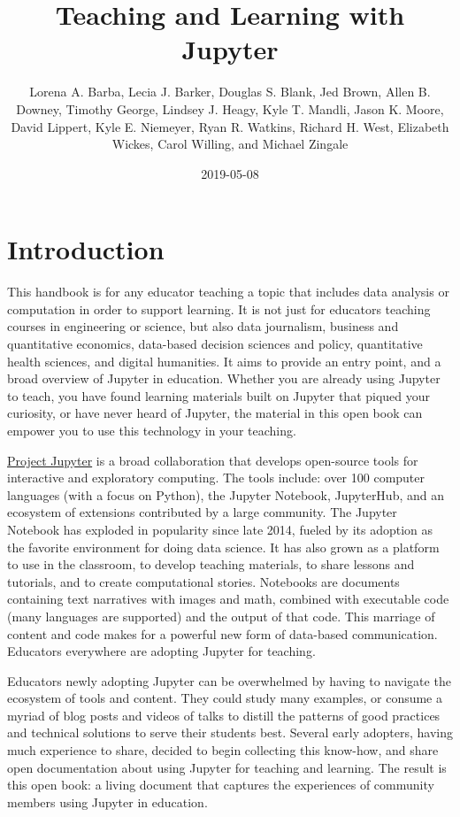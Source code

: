 \documentclass[]{book}
\title{Teaching and Learning with Jupyter}
\author{Lorena A. Barba, Lecia J. Barker, Douglas S. Blank, Jed Brown, Allen B. Downey, Timothy George, Lindsey J. Heagy, Kyle T. Mandli, Jason K. Moore, David Lippert, Kyle E. Niemeyer, Ryan R. Watkins, Richard H. West, Elizabeth Wickes, Carol Willing, and Michael Zingale}
\date{2019-05-08}
\begin{document}
\maketitle

{
\setcounter{tocdepth}{1}
\tableofcontents
}
\hypertarget{intro}{%
\chapter{Introduction}\label{intro}}

This handbook is for any educator teaching a topic that includes data analysis
or computation in order to support learning. It is not just for educators teaching courses in engineering or
science, but also data journalism, business and quantitative economics,
data-based decision sciences and policy, quantitative health sciences, and
digital humanities. It aims to provide an entry point, and a broad overview of
Jupyter in education. Whether you are already using Jupyter to teach, you have
found learning materials built on Jupyter that piqued your curiosity, or have
never heard of Jupyter, the material in this open book can empower you to
use this technology in your teaching.

\href{http://jupyter.org/}{Project Jupyter} is a broad collaboration that develops
open-source tools for interactive and exploratory computing. The tools include:
over 100 computer languages (with a focus on Python), the Jupyter Notebook, JupyterHub,
and an ecosystem of extensions
contributed by a large community. The Jupyter Notebook has exploded in popularity since
late 2014, fueled by its adoption as the favorite environment for doing data
science. It has also grown as a platform to use in the classroom, to develop
teaching materials, to share lessons and tutorials, and to create
computational stories. Notebooks are documents containing text narratives with images and math,
combined with executable code (many languages are supported) and the output of
that code. This marriage of content and code makes for a powerful new form of
data-based communication. Educators everywhere are adopting Jupyter for
teaching.

Educators newly adopting Jupyter can be overwhelmed by having to navigate the
ecosystem of tools and content. They could study many examples, or consume a
myriad of blog posts and videos of talks to distill the patterns of good practices
and technical solutions to serve their students best. Several early adopters,
having much experience to share, decided to begin collecting this know-how, and
share open documentation about using Jupyter for teaching and learning. The
result is this open book: a living document that captures the experiences of
community members using Jupyter in education.
\end{document}

